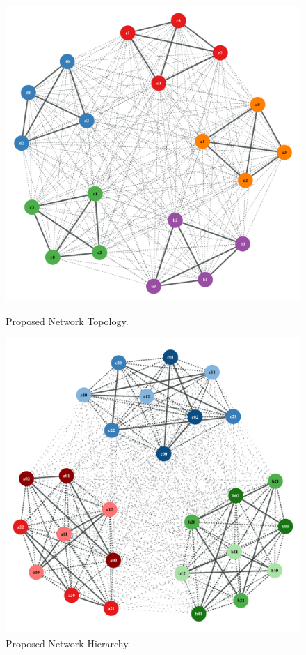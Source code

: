 \documentclass{article}
\begin{document}
\begin{figure}
    \centering
      \includegraphics[width=\linewidth]{figures/topology}
      \caption{Proposed Network Topology.}
      \label{fig:topology}
    \endminipage\hfill
      \includegraphics[width=\linewidth]{figures/tiers}
      \caption{Proposed Network Hierarchy.}
      \label{fig:tiers}
    \endminipage
\end{figure}
\end{document}
